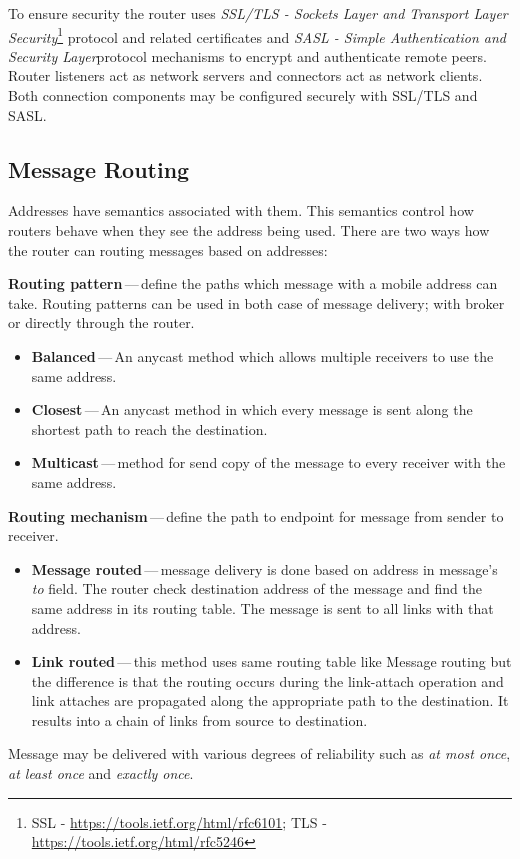 
To ensure security the router uses \emph{SSL/TLS - Sockets Layer and Transport Layer Security}\footnote{SSL - \url{https://tools.ietf.org/html/rfc6101}; TLS - \url{https://tools.ietf.org/html/rfc5246}} protocol and related certificates and \emph{SASL - Simple Authentication and Security Layer}\footnotemark protocol mechanisms to encrypt and authenticate remote peers. Router listeners act as network servers and connectors act as network clients. Both connection components may be configured securely with SSL/TLS and SASL.



\subsection{Message Routing}
\label{Message Routing}
Addresses have semantics associated with them. This semantics control how routers behave when they see the address being used. There are two ways how the router can routing messages based on addresses:

\begin{description}
	\setlength\itemsep{0em}
	\item \textbf{Routing pattern}\,---\,define the paths which message with a mobile address can take. Routing patterns can be used in both case of message delivery; with broker or directly through the router.
	\begin{itemize}
		\setlength\itemsep{0em}
		\item \textbf{Balanced}\,---\,An anycast method which allows multiple receivers to use the same address.
		\item \textbf{Closest}\,---\,An anycast method in which every message is sent along the shortest path to reach the destination.
		\item \textbf{Multicast}\,---\,method for send copy of the message to every receiver with the same address.
	\end{itemize}
	\item \textbf{Routing mechanism}\,---\,define the path to endpoint for message from sender to receiver.
	\begin{itemize}
		\setlength\itemsep{0em}
		\item \textbf{Message routed}\,---\,message delivery is done based on address in message's \emph{to} field. The router check destination address of the message and find the same address in its routing table. The message is sent to all links with that address.
		\item \textbf{Link routed}\,---\,this method uses same routing table like Message routing but the difference is that the routing occurs during the link-attach operation and link attaches are propagated along the appropriate path to the destination. It results into a chain of links from source to destination.
	\end{itemize}
\end{description}
Message may be delivered with various degrees of reliability such as \emph{at most once}, \emph{at least once} and \emph{exactly once}.

